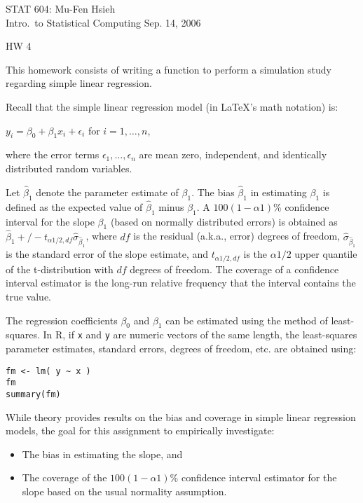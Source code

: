 \documentclass[12pt]{article}
\begin{document}
STAT 604: \hfill {Mu-Fen Hsieh}\\
Intro.\ to Statistical Computing \hfill {Sep. 14, 2006}

\begin{center}
\Large HW 4\\
\end{center}

This homework consists of writing a function to perform a simulation study regarding simple linear regression.

Recall that the simple linear regression model (in LaTeX's math notation) is:

$y_i = \beta_0 + \beta_1 x_i + \epsilon_i$ for $i=1,\ldots,n$,

where the error terms $\epsilon_1,\ldots,\epsilon_n$ are mean zero, independent, and identically distributed random variables.

Let $\hat{\beta}_1$ denote the parameter estimate of $\beta_1$. The bias $\hat{\beta}_1$ in estimating $\beta_1$ is defined as 
the expected value of $\hat{\beta}_1$ minus $\beta_1$. A $100(1-\alpha1)$\% confidence interval for the slope $\beta_1$ (based 
on normally distributed errors) is obtained as $\hat{\beta}_1 +/- t_{\alpha1/2,df} \hat{\sigma}_{\hat{\beta}_1}$, where $df$ is 
the residual (a.k.a., error) degrees of freedom, $\hat{\sigma}_{\hat{\beta}_1}$ is the standard error of the slope estimate, 
and $t_{\alpha1/2,df}$ is the $\alpha1/2$ upper quantile of the t-distribution with $df$ degrees of freedom. The coverage of a 
confidence interval estimator is the long-run relative frequency that the interval contains the true value. 

The regression coefficients $\beta_0$ and $\beta_1$ can be estimated using the method of least-squares. In R, if \texttt{x} and \texttt{y} are numeric vectors of the same length, the least-squares parameter estimates, standard errors, degrees of freedom, etc. are obtained using:
\begin{verbatim}fm <- lm( y ~ x )
fm
summary(fm)
\end{verbatim}

While theory provides results on the bias and coverage in simple linear regression models, the goal for this assignment to empirically investigate:
\begin{itemize}
\item The bias in estimating the slope, and
\item The coverage of the $100(1-\alpha1)$\% confidence interval estimator for the slope based on the usual normality assumption. 
\end{itemize}
\end{document}
